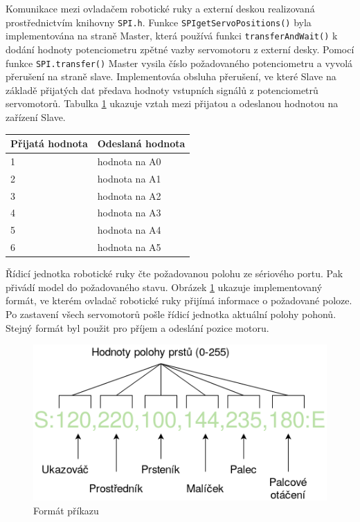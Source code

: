 \documentclass[thesis=B,czech]{FITthesis}[2012/06/26]
\begin{document}
\hspace{3cm}

Komunikace mezi ovladačem robotické ruky a externí deskou realizovaná prostřednictvím knihovny \texttt{SPI.h}. Funkce \texttt{SPIgetServoPositions()} byla implementována na straně Master, která používá funkci \texttt{transferAndWait()} k dodání hodnoty potenciometru zpětné vazby servomotoru z externí desky. Pomocí funkce \texttt{SPI.transfer()} Master vysila číslo požadovaného potenciometru a vyvolá přerušení na straně slave. Implementováa obsluha přerušení, ve které Slave na základě přijatých dat předava hodnoty vstupních signálů z potenciometrů servomotorů. Tabulka \ref{tab:MastSlaveKom} ukazuje vztah mezi přijatou a odeslanou hodnotou na zařízení Slave.

 \begin{table}[h]
 \centering
\begin{tabular}{|l|l|}
\hline
\textbf{Přijatá hodnota} & \textbf{Odeslaná hodnota} \\ \hline
1                         & hodnota na A0              \\ \hline
2                         & hodnota na A1              \\ \hline
3                         & hodnota na A2              \\ \hline
4                         & hodnota na A3              \\ \hline
5                         & hodnota na A4              \\ \hline
6                         & hodnota na A5              \\ \hline
\end{tabular}
\label{tab:MastSlaveKom}
\end{table}


Řídicí jednotka robotické ruky čte požadovanou polohu ze sériového portu. Pak přivádí model do požadovaného stavu. Obrázek \ref{fig:CommFormat} ukazuje implementovaný formát, ve kterém ovladač robotické ruky přijímá informace o požadované poloze. Po zastavení všech servomotorů pošle řídicí jednotka aktuální polohy pohonů. Stejný formát byl použit pro příjem a odeslání pozice motoru.


 \begin{figure}[h]
\centering
\includegraphics[scale=0.31]{./image/CommFormat.png}
\caption{Formát příkazu}
\label{fig:CommFormat}
\end{figure}
\end{document}
